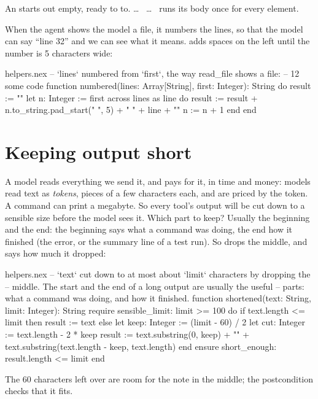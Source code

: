 An   starts out empty, ready to  to.
 \ldots\  \ldots\  runs its body once for
every element.

When the agent shows the model a file, it numbers the lines, so that the
model can say ``line 32'' and we can see what it means. 
adds spaces on the left until the number is 5 characters wide:

\begin{append}{helpers.nex}
-- `lines` numbered from `first`, the way read_file shows a file:
--    12  some code
function numbered(lines: Array[String], first: Integer): String do
  result := ""
  let n: Integer := first
  across lines as line do
    result := result + n.to_string.pad_start(" ", 5) + "  " + line + "\n"
    n := n + 1
  end
end
\end{append}

\section{Keeping output short}

A model reads everything we send it, and pays for it, in time and money:
models read text as \emph{tokens}, pieces of a few characters each, and
are priced by the token. A command can print a megabyte. So every tool's
output will be cut down to a sensible size before the model sees it.
Which part to keep? Usually the beginning and the end: the beginning says
what a command was doing, the end how it finished (the error, or the
summary line of a test run). So  drops the middle, and says
how much it dropped:

\begin{append}{helpers.nex}
-- `text` cut down to at most about `limit` characters by dropping the
-- middle. The start and the end of a long output are usually the useful
-- parts: what a command was doing, and how it finished.
function shortened(text: String, limit: Integer): String
require
  sensible_limit: limit >= 100
do
  if text.length <= limit then
    result := text
  else
    let keep: Integer := (limit - 60) / 2
    let cut: Integer := text.length - 2 * keep
    result := text.substring(0, keep)
      + "\n"
      + text.substring(text.length - keep, text.length)
  end
ensure
  short_enough: result.length <= limit
end
\end{append}

The 60 characters left over are room for the note in the middle; the
postcondition checks that it fits.

